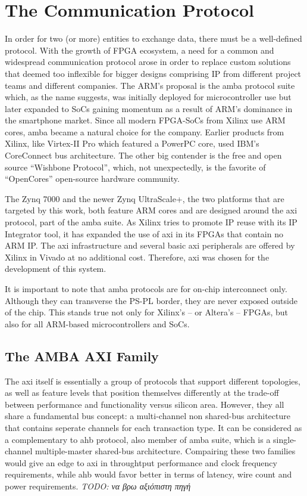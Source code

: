\section{The Communication Protocol}

In order for two (or more) entities to exchange data, 
there must be a well-defined protocol.
With the growth of FPGA ecosystem, a need for a common 
and widespread communication protocol arose
in order to replace custom solutions that deemed 
too inflexible for bigger designs comprising IP
from different project teams and different companies.
The ARM's proposal is the \gls{amba}\cite{amba} protocol suite
which, as the name suggests, was initially deployed 
for microcontroller use but later expanded to SoCs
gaining momentum as a result of ARM's dominance in the smartphone market. 
Since all modern FPGA-SoCs from Xilinx use ARM cores, 
\gls{amba} became a natural choice for the company. 
Earlier products from Xilinx, like Virtex-II Pro which
featured a PowerPC core, used IBM's CoreConnect bus architecture. 
The other big contender is the free and open source ``Wishbone Protocol'', 
which, not unexpectedly, is the favorite of 
``OpenCores'' open-source hardware community.

The Zynq 7000 and the newer Zynq UltraScale+, 
the two platforms that are targeted by this work,
both feature ARM cores and are designed around the \gls{axi} protocol,
part of the \gls{amba} suite. 
As Xilinx tries to promote IP reuse with its IP Integrator tool,
it has expanded the use of \gls{axi} in its FPGAs that contain no ARM IP. 
The \gls{axi} infrastructure and several basic \gls{axi} peripherals
are offered by Xilinx in Vivado at no additional cost.
Therefore, \gls{axi} was chosen for the development of this system.

It is important to note that \gls{amba} protocols are for on-chip interconnect only.
Although they can transverse the PS-PL border,
they are never exposed outside of the chip. 
This stands true not only for Xilinx's -- or Altera's -- FPGAs, 
but also for all ARM-based microcontrollers and SoCs.

\subsection{The AMBA AXI Family}

\label{amba}
The \gls{axi} itself is essentially a group of protocols that support different topologies,
as well as feature levels that position themselves differently at the trade-off 
between performance and functionality versus silicon area.
However, they all share a fundamental bus concept: 
a multi-channel non shared-bus architecture that contains seperate
channels for each \gls{transaction} type. It can be considered as a complementary
to \gls{ahb} protocol, also member of \gls{amba} suite, 
which is a single-channel multiple-master shared-bus architecture. 
Compairing these two families would give an edge to \gls{axi} in
throughtput performance and clock frequency requirements, while \gls{ahb} would favor
better in terms of latency, wire count and power requirements. 
\emph{TODO: να βρω αξιόπιστη πηγή}

